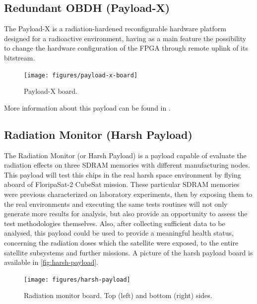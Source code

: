 \subsection{Redundant OBDH (Payload-X)}

The Payload-X is a radiation-hardened reconfigurable hardware platform designed for a radioactive environment, having as a main feature the possibility to change the hardware configuration of the FPGA through remote uplink of its bitstream.

\begin{figure}[!ht]
    \begin{center}
        \texttt{[image: figures/payload-x-board]}
        \caption{Payload-X board.}
        \label{fig:payload-x-board}
    \end{center}
\end{figure}

More information about this payload can be found in \cite{rigo2019}.

\subsection{Radiation Monitor (Harsh Payload)}

The Radiation Monitor (or Harsh Payload) is a payload capable of evaluate the radiation effects on three SDRAM memories with different manufacturing nodes. This payload will test this chips in the real harsh space environment by flying aboard of FloripaSat-2 CubeSat mission. These particular SDRAM memories were previous characterized on laboratory experiments, then by exposing them to the real environments and executing the same tests routines will not only generate more results for analysis, but also provide an opportunity to assess the test methodologies themselves. Also, after collecting sufficient data to be analysed, this payload could be used to provide a meaningful health status, concerning the radiation doses which the satellite were exposed, to the entire satellite subsystems and further missions. A picture of the harsh payload board is available in \autoref{fig:harsh-payload}.

\begin{figure}[!ht]
    \begin{center}
        \texttt{[image: figures/harsh-payload]}
        \caption{Radiation monitor board. Top (left) and bottom (right) sides.}
        \label{fig:harsh-payload}
    \end{center}
\end{figure}

